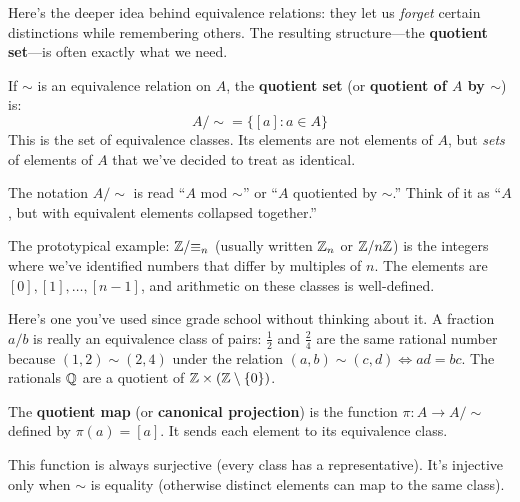 Here's the deeper idea behind equivalence relations: they let us \emph{forget} certain distinctions while remembering others. The resulting structure---the \textbf{quotient set}---is often exactly what we need.

\begin{definition}
If $\sim$ is an equivalence relation on $A$, the \textbf{quotient set} (or \textbf{quotient of $A$ by $\sim$}) is:
\[
A / {\sim} = \{[a] : a \in A\}
\]
This is the set of equivalence classes. Its elements are not elements of $A$, but \emph{sets} of elements of $A$ that we've decided to treat as identical.
\end{definition}

The notation $A/{\sim}$ is read ``$A$ mod $\sim$'' or ``$A$ quotiented by $\sim$.'' Think of it as ``$A$, but with equivalent elements collapsed together.''

\begin{example}
The prototypical example: $\mathbb{Z}/{\equiv_n}$ (usually written $\mathbb{Z}_n$ or $\mathbb{Z}/n\mathbb{Z}$) is the integers where we've identified numbers that differ by multiples of $n$. The elements are $[0], [1], \ldots, [n-1]$, and arithmetic on these classes is well-defined.
\end{example}

\begin{example}
Here's one you've used since grade school without thinking about it. A fraction $a/b$ is really an equivalence class of pairs: $\frac{1}{2}$ and $\frac{2}{4}$ are the same rational number because $(1, 2) \sim (2, 4)$ under the relation $(a, b) \sim (c, d) \iff ad = bc$. The rationals $\mathbb{Q}$ are a quotient of $\mathbb{Z} \times (\mathbb{Z} \setminus \{0\})$.
\end{example}

\begin{definition}
The \textbf{quotient map} (or \textbf{canonical projection}) is the function $\pi: A \to A/{\sim}$ defined by $\pi(a) = [a]$. It sends each element to its equivalence class.

This function is always surjective (every class has a representative). It's injective only when $\sim$ is equality (otherwise distinct elements can map to the same class).
\end{definition}

